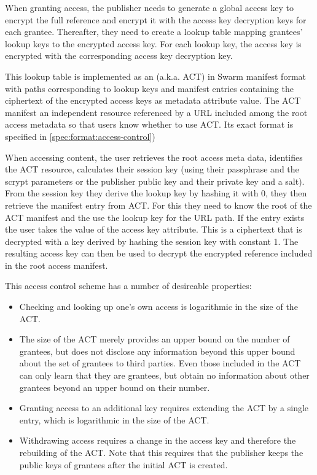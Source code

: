 When granting access, the publisher needs to generate a global access key to encrypt the full reference and encrypt it with the
access key decryption keys for each grantee. Thereafter, they need to create a lookup table mapping grantees' lookup keys to the encrypted access key. For each lookup key, the access key is encrypted with the corresponding access key decryption key.

This lookup table is implemented as an  (a.k.a. ACT) in Swarm manifest format with paths corresponding to lookup keys and manifest entries containing the ciphertext of the encrypted access keys as metadata attribute value. The ACT manifest an independent resource referenced by a URL included among the root access metadata so that users know whether to use ACT. Its exact format is specified in \ref{spec:format:access-control})

When accessing content, the user retrieves the root access meta data, identifies the ACT resource, calculates their session key (using their passphrase and the scrypt parameters or the publisher public key and their private key and a salt). From the session key they derive the lookup key by hashing it with 0, they then retrieve the manifest entry from ACT. For this they need to know the root of the ACT manifest and the use the lookup key for the URL path. If the entry exists the user takes the value of the access key attribute. This is a ciphertext that is decrypted with a key derived by hashing the session key with constant 1. The resulting access key can then be used to decrypt the encrypted reference included in the root access manifest.

This access control scheme has a number of desireable properties:
\begin{itemize}
\item Checking and looking up one's own access is logarithmic in the size of the ACT.
\item The size of the ACT merely provides an upper bound on the number of grantees, but does not disclose any information beyond this upper bound about the set of grantees to third parties. Even those included in the ACT can only learn that they are grantees, but obtain no information about other grantees beyond an upper bound on their number.
\item Granting access to an additional key requires extending the ACT by a single entry, which is logarithmic in the size of the ACT. 
\item Withdrawing access requires a change in the access key and therefore the rebuilding of the ACT. Note that this requires that the publisher keeps the public keys of grantees after the initial ACT is created.
\end{itemize}

